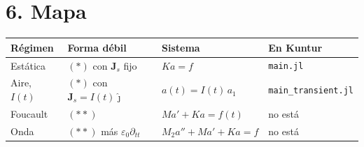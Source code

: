 \documentclass[11pt]{article}
\begin{document}
\section*{6. Mapa}

\begin{center}
\renewcommand{\arraystretch}{1.35}
\begin{tabular}{@{}llll@{}}
\toprule
Régimen & Forma débil & Sistema & En Kuntur \\
\midrule
Estática & \((\ast)\) con \(\mathbf{J}_{s}\) fijo & \(Ka=f\) & \texttt{main.jl} \\
Aire, \(I(t)\) & \((\ast)\) con \(\mathbf{J}_{s}=I(t)\hat{\jmath}\) & \(a(t)=I(t)\,a_{1}\) & \texttt{main\_transient.jl} \\
Foucault & \((\ast\ast)\) & \(M a'+Ka=f(t)\) & no está \\
Onda & \((\ast\ast)\) más \(\varepsilon_{0}\partial_{tt}\) & \(M_{2}a''+Ma'+Ka=f\) & no está \\
\bottomrule
\end{tabular}
\end{center}
\end{document}
